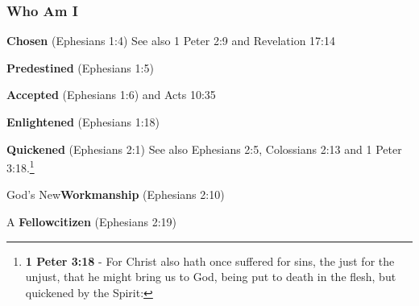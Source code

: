 \subsubsection{Who Am I}
\begin{compactenum}[I.][8]
    \item \textbf{Chosen}  (Ephesians 1:4) See also   1 Peter 2:9 and  Revelation 17:14
    \item \textbf{Predestined}  (Ephesians 1:5)
    \item \textbf{Accepted}  (Ephesians 1:6) and Acts 10:35
    \item \textbf{Enlightened}  (Ephesians 1:18)
    \item \textbf{Quickened}  (Ephesians 2:1) See also Ephesians 2:5, Colossians 2:13 and 1 Peter 3:18.\footnote{\textbf{1 Peter 3:18} - For Christ also hath once suffered for sins, the just for the unjust, that he might bring us to God, being put to death in the flesh, but quickened by the Spirit:}
    \item God's New\textbf{Workmanship}  (Ephesians 2:10)
    \item A \textbf{Fellowcitizen}  (Ephesians 2:19)
\end{compactenum}

